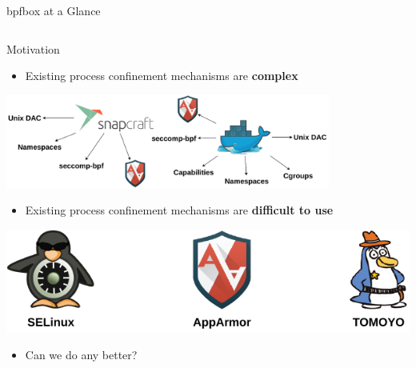 \documentclass[12pt, dvipsnames, aspectratio=169]{beamer}
\begin{document}
\begin{frame}[c]{bpfbox at a Glance}
\begin{columns}
\begin{column}{0.4\textwidth}
\begin{center}
        \end{center}
        \vspace{1em}
    \end{column}
\end{columns}
\end{frame}

\begin{frame}[c]{Motivation}
\begin{itemize}
    \item Existing process confinement mechanisms are \textbf{complex}
\end{itemize}
\begin{center}
    \color{black}
    \includegraphics[width=0.8\textwidth]{figs/process-confinement-landscape.pdf}
\end{center}
\begin{itemize}
    \item Existing process confinement mechanisms are \textbf{difficult to use}
\end{itemize}
\begin{center}
    \color{black}
    \includegraphics[height=0.2\textheight]{figs/mac.pdf}
\end{center}
\begin{itemize}
    \item Can we do any better?
\end{itemize}
\end{frame}
\end{document}
